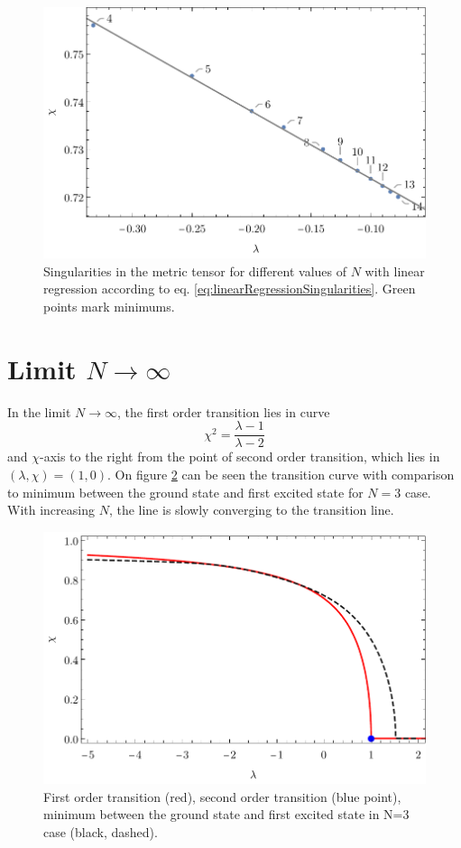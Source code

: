 \begin{figure}[h]
    \centering
    \includegraphics{../img/divPosition.pdf}
    \caption{Singularities in the metric tensor for different values of $N$ with linear regression according to eq. \ref{eq:linearRegressionSingularities}. Green points mark minimums.}
    \label{fig:singularitiesRegr}    
\end{figure}




\section{Limit $N\rightarrow \infty$}
In the limit $N\rightarrow \infty$, the first order transition lies in curve
\begin{equation}
    \chi^2=\frac{\lambda-1}{\lambda-2}
\end{equation}
and $\chi$-axis to the right from the point of second order transition, which lies in $(\lambda,\chi)=(1,0)$. On figure \ref{fig:transitionCompare} can be seen the transition curve with comparison to minimum between the ground state and first excited state for $N=3$ case. With increasing $N$, the line is slowly converging to the transition line.

\begin{figure}[h]
    \centering
    \includegraphics{../img/infiniteN_transitionCompare.pdf}
    \caption{First order transition (red), second order transition (blue point), minimum between the ground state and first excited state in N=3 case (black, dashed).}
    \label{fig:transitionCompare}    
\end{figure}